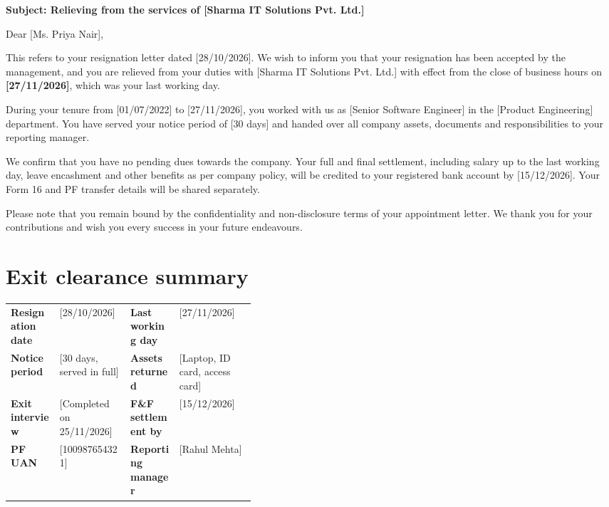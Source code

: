 \documentclass[10pt]{article}
\begin{document}
\textbf{Subject: Relieving from the services of [Sharma IT Solutions Pvt. Ltd.]}\par\vspace{4pt}

Dear [Ms. Priya Nair],\par\vspace{4pt}

This refers to your resignation letter dated [28/10/2026]. We wish to inform you that your resignation has been accepted by the management, and you are relieved from your duties with [Sharma IT Solutions Pvt. Ltd.] with effect from the close of business hours on \textbf{[27/11/2026]}, which was your last working day.\par\vspace{4pt}

During your tenure from [01/07/2022] to [27/11/2026], you worked with us as [Senior Software Engineer] in the [Product Engineering] department. You have served your notice period of [30 days] and handed over all company assets, documents and responsibilities to your reporting manager.\par\vspace{4pt}

We confirm that you have no pending dues towards the company. Your full and final settlement, including salary up to the last working day, leave encashment and other benefits as per company policy, will be credited to your registered bank account by [15/12/2026]. Your Form 16 and PF transfer details will be shared separately.\par\vspace{4pt}

Please note that you remain bound by the confidentiality and non-disclosure terms of your appointment letter. We thank you for your contributions and wish you every success in your future endeavours.\par\vspace{4pt}

\section{Exit clearance summary}

\begin{tabularx}{\linewidth}{@{}p{0.2\linewidth}X p{0.2\linewidth}X@{}}
\textbf{Resignation date} & [28/10/2026] & \textbf{Last working day} & [27/11/2026] \\
\textbf{Notice period} & [30 days, served in full] & \textbf{Assets returned} & [Laptop, ID card, access card] \\
\textbf{Exit interview} & [Completed on 25/11/2026] & \textbf{F\&F settlement by} & [15/12/2026] \\
\textbf{PF UAN} & [100987654321] & \textbf{Reporting manager} & [Rahul Mehta] \\
\end{tabularx}\par\vspace{2pt}
\end{document}
